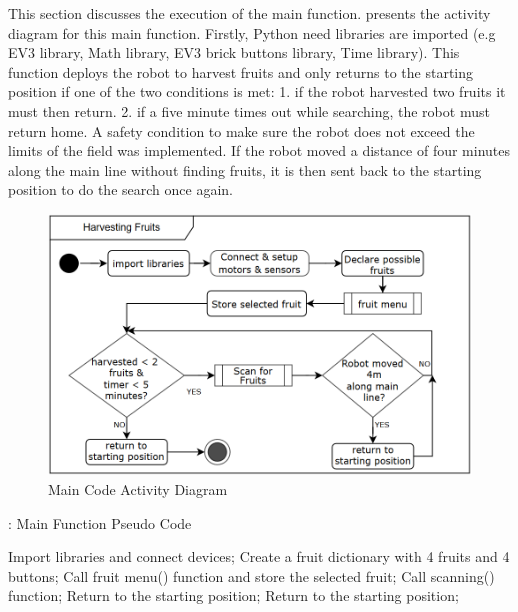 \noindent This section discusses the execution of the main function.  presents the activity diagram for this main function. Firstly, Python need libraries are imported (e.g EV3 library, Math library, EV3 brick buttons library, Time library). This function deploys the robot to harvest fruits and only returns to the starting position if one of the two conditions is met: 1. if the robot harvested two fruits it must then return. 2. if a five minute times out while searching, the robot must return home. A safety condition to make sure the robot does not exceed the limits of the field was implemented. If the robot moved a distance of four minutes along the main line without finding fruits, it is then sent back to the starting position to do the search once again.
\begin{figure}[!ht]
	\centering
	\includegraphics[width=\linewidth]{Graphics/mainCodeActivityDiagram3}
	\caption{Main Code Activity Diagram}
	\label{fig:MainCodeActivityDiagram}
\end{figure}

\vspace{-5mm}

\begin{algorithm}
	\caption{: Main Function Pseudo Code}\label{mainPseudo}
	\begin{algorithmic}[1]
		\State Import libraries and connect devices;
		\State Create a fruit dictionary with 4 fruits and 4 buttons;
		\State Call fruit menu() function and store the selected fruit;
		\State Call scanning() function;
				\State Return to the starting position;
			\EndIf
		\EndWhile
		\State Return to the starting position;
	\end{algorithmic}
\end{algorithm}

